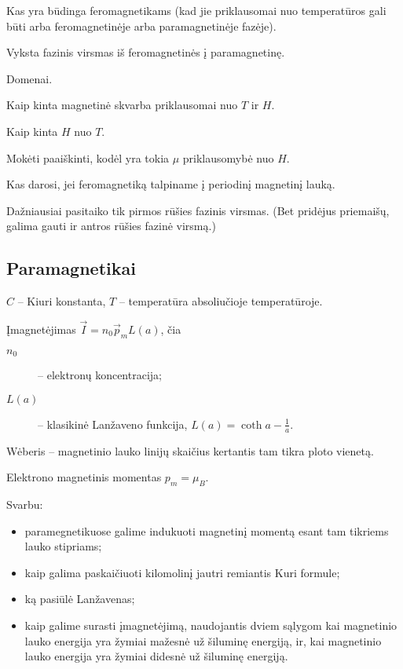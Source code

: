 \begin{remember}
  \item Kas yra būdinga feromagnetikams (kad jie priklausomai nuo
    temperatūros gali būti arba feromagnetinėje arba paramagnetinėje
    fazėje).
  \item Vyksta fazinis virsmas iš feromagnetinės į paramagnetinę.
  \item Domenai.
  \item Kaip kinta magnetinė skvarba priklausomai nuo $T$ ir $H$.
  \item Kaip kinta $H$ nuo $T$.
  \item Mokėti paaiškinti, kodėl yra tokia $\mu$ priklausomybė nuo $H$.
  \item Kas darosi, jei feromagnetiką talpiname į periodinį magnetinį
    lauką.
\end{remember}

\begin{note}
  Dažniausiai pasitaiko tik pirmos rūšies fazinis virsmas. (Bet pridėjus
  priemaišų, galima gauti ir antros rūšies fazinė virsmą.)
\end{note}

\subsection{Paramagnetikai}

$C$ – Kiuri konstanta,
$T$ – temperatūra absoliučioje temperatūroje.

Įmagnetėjimas $\vec{I} = n_{0}\vec{p}_{m}L(a)$, čia
\begin{description}
  \item[$n_{0}$] – elektronų koncentracija;
  \item[$L(a)$] – klasikinė Lanžaveno funkcija,
    $L(a) = \coth a - \frac{1}{a}$.
\end{description}

Wėberis – magnetinio lauko linijų skaičius kertantis tam tikra ploto
vienetą.

Elektrono magnetinis momentas $p_{m} = \mu_{B}$.

Svarbu:
\begin{itemize}
  \item paramegnetikuose galime indukuoti magnetinį momentą esant
    tam tikriems lauko stipriams;
  \item kaip galima paskaičiuoti kilomolinį jautri remiantis Kuri
    formule;
  \item ką pasiūlė Lanžavenas;
  \item kaip galime surasti įmagnetėjimą, naudojantis dviem sąlygom
    kai magnetinio lauko energija yra žymiai mažesnė už šiluminę
    energiją, ir, kai magnetinio lauko energija yra žymiai didesnė
    už šiluminę energiją.
\end{itemize}

